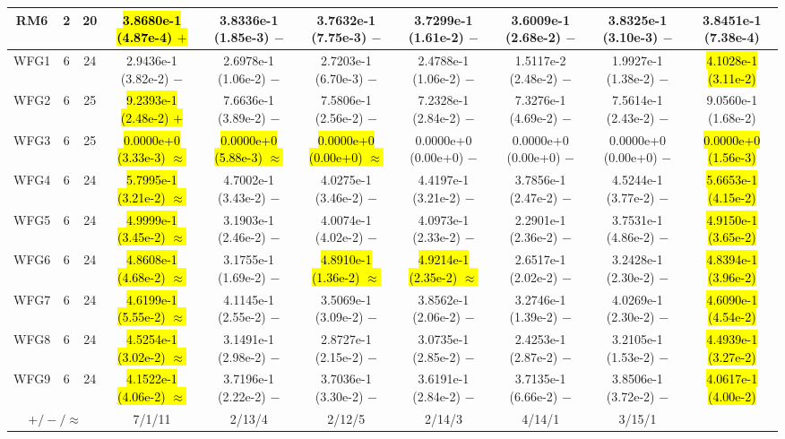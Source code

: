 \documentclass[journal]{IEEEtran}
\begin{document}
\begin{table*}[htbp]
\begin{tabular}{cccccccccc}
\hline
\multirow{1}{*}{RM6}&2&20&\hl{3.8680e-1 (4.87e-4) $+$}&3.8336e-1 (1.85e-3) $-$&3.7632e-1 (7.75e-3) $-$&3.7299e-1 (1.61e-2) $-$&3.6009e-1 (2.68e-2) $-$&3.8325e-1 (3.10e-3) $-$&3.8451e-1 (7.38e-4)\\
\hline
\multirow{1}{*}{WFG1}&6&24&2.9436e-1 (3.82e-2) $-$&2.6978e-1 (1.06e-2) $-$&2.7203e-1 (6.70e-3) $-$&2.4788e-1 (1.06e-2) $-$&1.5117e-2 (2.48e-2) $-$&1.9927e-1 (1.38e-2) $-$&\hl{4.1028e-1 (3.11e-2)}\\
\hline
\multirow{1}{*}{WFG2}&6&25&\hl{9.2393e-1 (2.48e-2) $+$}&7.6636e-1 (3.89e-2) $-$&7.5806e-1 (2.56e-2) $-$&7.2328e-1 (2.84e-2) $-$&7.3276e-1 (4.69e-2) $-$&7.5614e-1 (2.43e-2) $-$&9.0560e-1 (1.68e-2)\\
\hline
\multirow{1}{*}{WFG3}&6&25&\hl{0.0000e+0 (3.33e-3) $\approx$}&\hl{0.0000e+0 (5.88e-3) $\approx$}&\hl{0.0000e+0 (0.00e+0) $\approx$}&0.0000e+0 (0.00e+0) $-$&0.0000e+0 (0.00e+0) $-$&0.0000e+0 (0.00e+0) $-$&\hl{0.0000e+0 (1.56e-3)}\\
\hline
\multirow{1}{*}{WFG4}&6&24&\hl{5.7995e-1 (3.21e-2) $\approx$}&4.7002e-1 (3.43e-2) $-$&4.0275e-1 (3.46e-2) $-$&4.4197e-1 (3.21e-2) $-$&3.7856e-1 (2.47e-2) $-$&4.5244e-1 (3.77e-2) $-$&\hl{5.6653e-1 (4.15e-2)}\\
\hline
\multirow{1}{*}{WFG5}&6&24&\hl{4.9999e-1 (3.45e-2) $\approx$}&3.1903e-1 (2.46e-2) $-$&4.0074e-1 (4.02e-2) $-$&4.0973e-1 (2.33e-2) $-$&2.2901e-1 (2.36e-2) $-$&3.7531e-1 (4.86e-2) $-$&\hl{4.9150e-1 (3.65e-2)}\\
\hline
\multirow{1}{*}{WFG6}&6&24&\hl{4.8608e-1 (4.68e-2) $\approx$}&3.1755e-1 (1.69e-2) $-$&\hl{4.8910e-1 (1.36e-2) $\approx$}&\hl{4.9214e-1 (2.35e-2) $\approx$}&2.6517e-1 (2.02e-2) $-$&3.2428e-1 (2.30e-2) $-$&\hl{4.8394e-1 (3.96e-2)}\\
\hline
\multirow{1}{*}{WFG7}&6&24&\hl{4.6199e-1 (5.55e-2) $\approx$}&4.1145e-1 (2.55e-2) $-$&3.5069e-1 (3.09e-2) $-$&3.8562e-1 (2.06e-2) $-$&3.2746e-1 (1.39e-2) $-$&4.0269e-1 (2.30e-2) $-$&\hl{4.6090e-1 (4.54e-2)}\\
\hline
\multirow{1}{*}{WFG8}&6&24&\hl{4.5254e-1 (3.02e-2) $\approx$}&3.1491e-1 (2.98e-2) $-$&2.8727e-1 (2.15e-2) $-$&3.0735e-1 (2.85e-2) $-$&2.4253e-1 (2.87e-2) $-$&3.2105e-1 (1.53e-2) $-$&\hl{4.4939e-1 (3.27e-2)}\\
\hline
\multirow{1}{*}{WFG9}&6&24&\hl{4.1522e-1 (4.06e-2) $\approx$}&3.7196e-1 (2.22e-2) $-$&3.7036e-1 (3.30e-2) $-$&3.6191e-1 (2.84e-2) $-$&3.7135e-1 (6.66e-2) $-$&3.8506e-1 (3.72e-2) $-$&\hl{4.0617e-1 (4.00e-2)}\\
\hline
\multicolumn{3}{c}{$+/-/\approx$}&7/1/11&2/13/4&2/12/5&2/14/3&4/14/1&3/15/1&\\
\bottomrule
\end{tabular}
\label{No Label}
\end{table*}
\end{document}
